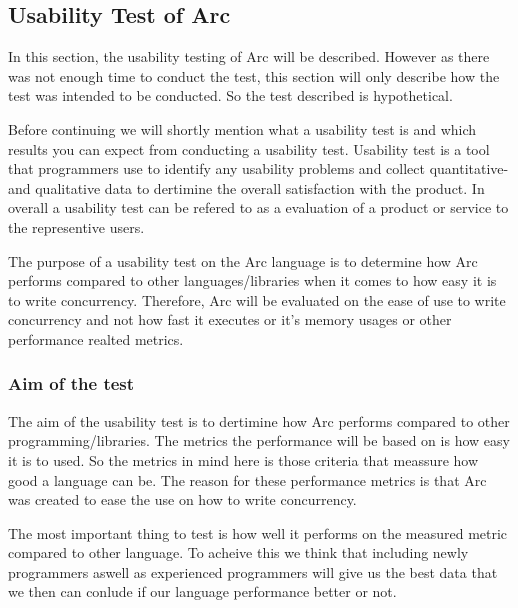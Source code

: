 \subsection{Usability Test of Arc}\label{subsec:usabilityTestOfArc}
In this section, the usability testing of Arc will be described. However as there was not enough time to conduct the test, this section will only describe how the test was intended to be conducted. So the test described is hypothetical.

Before continuing we will shortly mention what a usability test is and which results you can expect from conducting a usability test. Usability test is a tool that programmers use to identify any usability problems and collect quantitative- and qualitative data to dertimine the overall satisfaction with the product. In overall a usability test can be refered to as a evaluation of a product or service to the representive users.

The purpose of a usability test on the Arc language is to determine how Arc performs compared to other languages/libraries when it comes to how easy it is to write concurrency. Therefore, Arc will be evaluated on the ease of use to write concurrency and not how fast it executes or it's memory usages or other performance realted metrics.

\subsubsection{Aim of the test}\label{subsubsec:aimOfTheTest}
The aim of the usability test is to dertimine how Arc performs compared to other programming/libraries. The metrics the performance will be based on is how easy it is to used. So the metrics in mind here is those criteria that meassure how good a language can be. The reason for these performance metrics is that Arc was created to ease the use on how to write concurrency.

The most important thing to test is how well it performs on the measured metric compared to other language. To acheive this we think that including newly programmers aswell as experienced programmers will give us the best data that we then can conlude if our language performance better or not.


